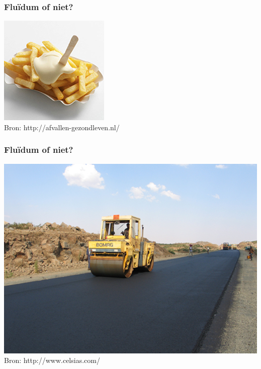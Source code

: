 \documentclass[t]{beamer}
\begin{document}
  		\begin{frame}
  			\frametitle{Fluïdum of niet?}
			\center
    		\includegraphics[height=0.8\textheight]{../fig/basisbegrippen/mayonaise.png}\\
			\footnotesize{Bron: http://afvallen-gezondleven.nl/}
  		\end{frame}
  		\begin{frame}
  			\frametitle{Fluïdum of niet?}
			\center
    		\includegraphics[height=0.8\textheight]{../fig/basisbegrippen/asfalt.png}\\
			\footnotesize{Bron: http://www.celsias.com/}
  		\end{frame}
\end{document}
